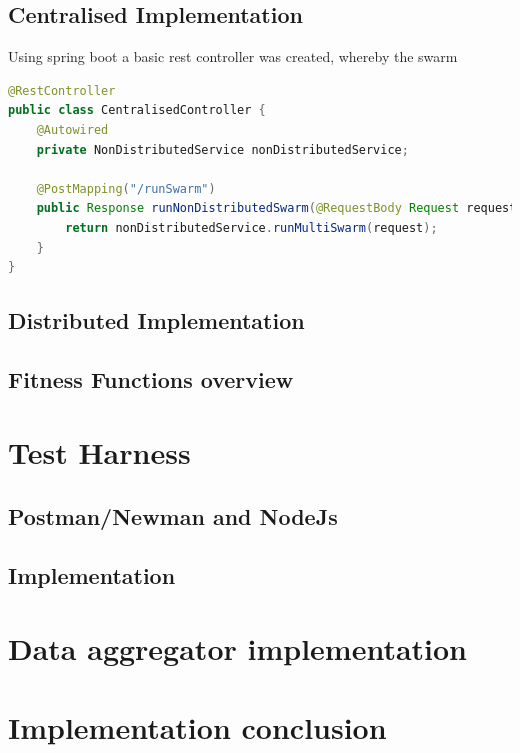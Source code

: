 \documentclass[oneside,12pt]{book}
\begin{document}
\subsection{Centralised Implementation}
Using spring boot a basic rest controller was created, whereby the swarm 
\begin{lstlisting}[language=Java]
@RestController
public class CentralisedController {
    @Autowired
    private NonDistributedService nonDistributedService;

    @PostMapping("/runSwarm")
    public Response runNonDistributedSwarm(@RequestBody Request request) throws Exception {
        return nonDistributedService.runMultiSwarm(request);
    }
}
\end{lstlisting}

\subsection{Distributed Implementation}

\subsection{Fitness Functions overview}

\section{Test Harness}

\subsection{Postman/Newman and NodeJs}

\subsection{Implementation}

\section{Data aggregator implementation}

\section{Implementation conclusion}


\end{document}
